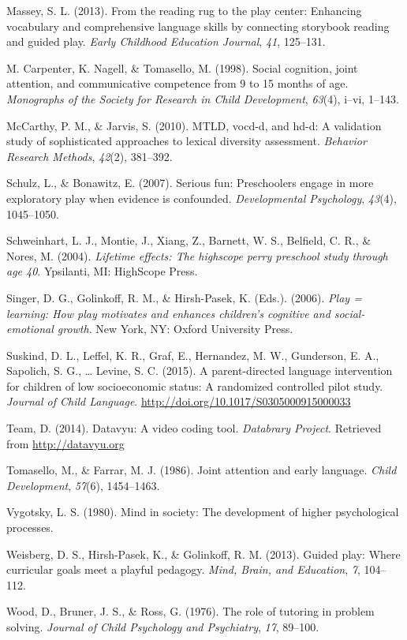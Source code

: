 \documentclass[]{article}
\begin{document}
\leavevmode\hypertarget{ref-Massey2013}{}%
Massey, S. L. (2013). From the reading rug to the play center: Enhancing
vocabulary and comprehensive language skills by connecting storybook
reading and guided play. \emph{Early Childhood Education Journal},
\emph{41}, 125--131.

\leavevmode\hypertarget{ref-Carpenter1998}{}%
M. Carpenter, K. Nagell, \& Tomasello, M. (1998). Social cognition,
joint attention, and communicative competence from 9 to 15 months of
age. \emph{Monographs of the Society for Research in Child Development},
\emph{63}(4), i--vi, 1--143.

\leavevmode\hypertarget{ref-McCarthy2010}{}%
McCarthy, P. M., \& Jarvis, S. (2010). MTLD, vocd-d, and hd-d: A
validation study of sophisticated approaches to lexical diversity
assessment. \emph{Behavior Research Methods}, \emph{42}(2), 381--392.

\leavevmode\hypertarget{ref-Schulz2007}{}%
Schulz, L., \& Bonawitz, E. (2007). Serious fun: Preschoolers engage in
more exploratory play when evidence is confounded. \emph{Developmental
Psychology}, \emph{43}(4), 1045--1050.

\leavevmode\hypertarget{ref-PerryPreschool2004}{}%
Schweinhart, L. J., Montie, J., Xiang, Z., Barnett, W. S., Belfield, C.
R., \& Nores, M. (2004). \emph{Lifetime effects: The highscope perry
preschool study through age 40}. Ypsilanti, MI: HighScope Press.

\leavevmode\hypertarget{ref-Singer2006}{}%
Singer, D. G., Golinkoff, R. M., \& Hirsh-Pasek, K. (Eds.). (2006).
\emph{Play = learning: How play motivates and enhances children's
cognitive and social-emotional growth}. New York, NY: Oxford University
Press.

\leavevmode\hypertarget{ref-Suskind2015}{}%
Suskind, D. L., Leffel, K. R., Graf, E., Hernandez, M. W., Gunderson, E.
A., Sapolich, S. G., \ldots{} Levine, S. C. (2015). A parent-directed
language intervention for children of low socioeconomic status: A
randomized controlled pilot study. \emph{Journal of Child Language}.
\url{http://doi.org/10.1017/S0305000915000033}

\leavevmode\hypertarget{ref-datavyu}{}%
Team, D. (2014). Datavyu: A video coding tool. \emph{Databrary Project}.
Retrieved from \url{http://datavyu.org}

\leavevmode\hypertarget{ref-Tomasello1986}{}%
Tomasello, M., \& Farrar, M. J. (1986). Joint attention and early
language. \emph{Child Development}, \emph{57}(6), 1454--1463.

\leavevmode\hypertarget{ref-Vygotsky1980}{}%
Vygotsky, L. S. (1980). Mind in society: The development of higher
psychological processes.

\leavevmode\hypertarget{ref-Weisberg2013}{}%
Weisberg, D. S., Hirsh-Pasek, K., \& Golinkoff, R. M. (2013). Guided
play: Where curricular goals meet a playful pedagogy. \emph{Mind, Brain,
and Education}, \emph{7}, 104--112.

\leavevmode\hypertarget{ref-Wood1976}{}%
Wood, D., Bruner, J. S., \& Ross, G. (1976). The role of tutoring in
problem solving. \emph{Journal of Child Psychology and Psychiatry},
\emph{17}, 89--100.
\end{document}
